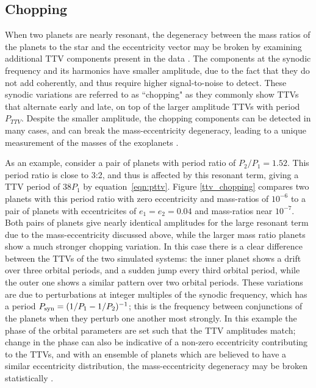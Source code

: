 \documentclass[graybox,natbib,nosecnum]{svmult}
\begin{document}
\subsection{Chopping}

When two planets are nearly resonant, the degeneracy between the mass ratios of the planets to the star
and the eccentricity vector may be broken by examining additional TTV components present in the data \citep{2015ApJ...802..116D}.
The components at the synodic frequency and its harmonics have smaller amplitude, due to 
the fact that they do not add coherently, and thus require higher signal-to-noise to detect.
These synodic variations are referred to as ``chopping" as they commonly
show TTVs that alternate early and late, on top of the larger amplitude TTVs with period $P_{TTV}$.
Despite the smaller amplitude, the chopping components can be detected in many cases, and can break
the mass-eccentricity degeneracy, leading to a unique measurement of the masses of the exoplanets 
\citep{2014ApJ...790...58N,2014ApJ...795..167S,2015ApJ...802..116D}.

As an example, consider a pair of planets with period ratio of $P_2/P_1 = 1.52$.  This period ratio
is close to 3:2, and thus is affected by this resonant term, giving a TTV period of $38 P_1$ by equation~\ref{eqn:pttv}.
Figure \ref{ttv_chopping} compares two planets with this period ratio with zero eccentricity
and mass-ratios of $10^{-6}$ to a pair of planets with eccentricites of $e_1=e_2=0.04$
and mass-ratios near $10^{-7}$.  Both pairs of planets give nearly identical amplitudes
for the large resonant term due to the mass-eccentricity discussed above, while the larger mass ratio planets show a 
much stronger chopping variation.  In this case there is a clear difference between the TTVs of the two simulated
systems:  the inner planet shows a drift over three orbital periods, and a sudden jump
every third orbital period, while the outer one shows a similar pattern over two orbital
periods.  These variations are due to perturbations at integer multiples of the synodic
frequency, which has a period $P_{\rm syn}= (1/P_1-1/P_2)^{-1}$; this is the frequency between conjunctions of
the planets when they perturb one another most strongly.  In this example the phase of the orbital parameters are set such that the TTV amplitudes match;  change
in the phase can also be indicative of a non-zero eccentricity contributing to the TTVs,
and with an ensemble of planets which are believed to have a similar eccentricity
distribution, the mass-eccentricity degeneracy may be broken statistically \citep{2012ApJ...761..122L,
2014ApJ...787...80H}.
\end{document}
